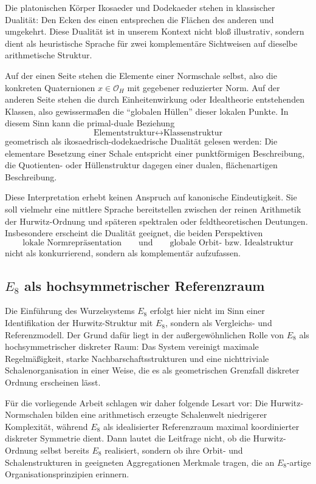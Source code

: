 \documentclass[a4paper,12pt]{article}
\theoremstyle{definition}
\numberwithin{equation}{section}
\begin{document}
	Die platonischen Körper Ikosaeder und Dodekaeder stehen in klassischer Dualität: Den Ecken des einen entsprechen die Flächen des anderen und umgekehrt. Diese Dualität ist in unserem Kontext nicht bloß illustrativ, sondern dient als heuristische Sprache für zwei komplementäre Sichtweisen auf dieselbe arithmetische Struktur.
	
	Auf der einen Seite stehen die Elemente einer Normschale selbst, also die konkreten Quaternionen $x \in \mathcal O_H$ mit gegebener reduzierter Norm. Auf der anderen Seite stehen die durch Einheitenwirkung oder Idealtheorie entstehenden Klassen, also gewissermaßen die ``globalen Hüllen'' dieser lokalen Punkte. In diesem Sinn kann die primal-duale Beziehung
	\[
	\text{Elementstruktur} \longleftrightarrow \text{Klassenstruktur}
	\]
	geometrisch als ikosaedrisch-dodekaedrische Dualität gelesen werden: Die elementare Besetzung einer Schale entspricht einer punktförmigen Beschreibung, die Quotienten- oder Hüllenstruktur dagegen einer dualen, flächenartigen Beschreibung.
	
	Diese Interpretation erhebt keinen Anspruch auf kanonische Eindeutigkeit. Sie soll vielmehr eine mittlere Sprache bereitstellen zwischen der reinen Arithmetik der Hurwitz-Ordnung und späteren spektralen oder feldtheoretischen Deutungen. Insbesondere erscheint die Dualität geeignet, die beiden Perspektiven
	\[
	\text{lokale Normrepräsentation} \qquad \text{und} \qquad \text{globale Orbit- bzw. Idealstruktur}
	\]
	nicht als konkurrierend, sondern als komplementär aufzufassen.
	
	\subsection{$E_8$ als hochsymmetrischer Referenzraum}
	
	Die Einführung des Wurzelsystems $E_8$ erfolgt hier nicht im Sinn einer Identifikation der Hurwitz-Struktur mit $E_8$, sondern als Vergleichs- und Referenzmodell. Der Grund dafür liegt in der außergewöhnlichen Rolle von $E_8$ als hochsymmetrischer diskreter Raum: Das System vereinigt maximale Regelmäßigkeit, starke Nachbarschaftsstrukturen und eine nichttriviale Schalenorganisation in einer Weise, die es als geometrischen Grenzfall diskreter Ordnung erscheinen lässt.
	
	Für die vorliegende Arbeit schlagen wir daher folgende Lesart vor: Die Hurwitz-Normschalen bilden eine arithmetisch erzeugte Schalenwelt niedrigerer Komplexität, während $E_8$ als idealisierter Referenzraum maximal koordinierter diskreter Symmetrie dient. Dann lautet die Leitfrage nicht, ob die Hurwitz-Ordnung selbst bereits $E_8$ realisiert, sondern ob ihre Orbit- und Schalenstrukturen in geeigneten Aggregationen Merkmale tragen, die an $E_8$-artige Organisationsprinzipien erinnern.
	
\end{document}
